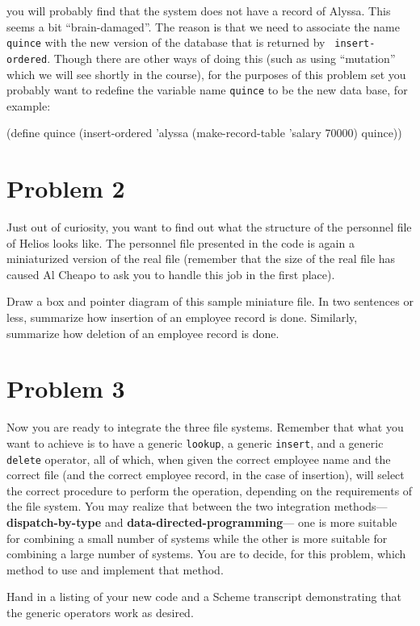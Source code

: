 you will probably find that the system does not have a record of Alyssa.  This
seems a bit ``brain-damaged''.  The reason is that we need to associate the
name {\tt quince} with the new version of the database that is returned by {\tt
insert-ordered}.  Though there are other ways of doing this (such as using
``mutation'' which we will see shortly in the course), for the purposes of this
problem set you probably want to redefine the variable name {\tt quince} to be
the new data base, for example:

\beginlisp
(define quince (insert-ordered 'alyssa (make-record-table 'salary 70000) quince))
\endlisp

\section{Problem 2}

Just out of curiosity,  you want to find out what the structure
of the personnel file of Helios looks like.  The personnel
file presented in the code is again a miniaturized version of the
real file (remember that the size of the real file has caused
Al Cheapo to ask you to handle this job in the first place).

Draw a box and pointer diagram of this sample miniature file.
In two sentences or less, summarize how insertion of an
employee record is done.  Similarly, summarize how deletion of an
employee record is done.

\section{Problem 3}

Now you are ready to integrate the three file
systems. Remember that what you want to achieve is to have a generic
{\tt lookup}, a generic {\tt insert}, and a generic {\tt delete} operator,
all of which, when given the correct employee name and the correct file (and
the correct employee record, in the case of insertion), will
select the correct procedure to perform the operation, depending on the
requirements of the file system.
You may realize that between the two
integration methods--- {\bf dispatch-by-type} and
{\bf data-directed-programming}---
one is more suitable for combining a small number of systems
while the other is more suitable for combining a large number
of systems.  You are to decide, for this problem, which
method to use and implement that method.

Hand in a listing of your new code and a {\sc Scheme} transcript
demonstrating that the generic operators work as desired.

